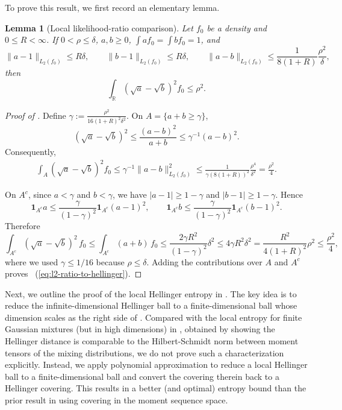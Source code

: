 \documentclass[letterpaper,11pt]{article}
\newcommand{\eqref}[1]{~(\ref{#1})}
\newtheorem{lemma}[theorem]{Lemma}
\theoremstyle{definition}
\begin{document}
To prove this result, we first record an elementary lemma.

\begin{lemma}[Local likelihood-ratio comparison]
\label{lmm:l2ratiohellinger}
Let $f_0$ be a density and $0\le R<\infty$.  
If $0<\rho\le\delta$, $a,b\ge0$, $\int a f_0=\int b f_0=1$, and
\[
\|a-1\|_{L_2(f_0)}\le R\delta,
\qquad
\|b-1\|_{L_2(f_0)}\le R\delta,
\qquad
\|a-b\|_{L_2(f_0)}
\le
\frac{1}{8(1+R)}
\frac{\rho^2}{\delta},
\]
then
\begin{equation}
\label{eq:l2-ratio-to-hellinger}
\int_{\mathbb R}(\sqrt a-\sqrt b)^2f_0\le\rho^2.
\end{equation}
\end{lemma}
\begin{proof}[Proof of ]
Define
$\gamma:=\frac{\rho^2}{16(1+R)^2\delta^2}$.
  On
$A=\{a+b\ge\gamma\}$,
\[
(\sqrt a-\sqrt b)^2\le\frac{(a-b)^2}{a+b}
\le \gamma^{-1}(a-b)^2.
\]
Consequently,
\[
\begin{aligned}
\int_A(\sqrt a-\sqrt b)^2f_0
\le
\gamma^{-1}\|a-b\|_{L_2(f_0)}^2 
\le
\frac{1}{\gamma (8(1+R))^2}
\frac{\rho^4}{\delta^2}
=\frac{\rho^2}{4}.
\end{aligned}
\]

On $A^c$, since $a<\gamma$ and $b<\gamma$, we have
$|a-1|\ge 1-\gamma$ and $|b-1|\ge 1-\gamma$. 
Hence
\[
\mathbf 1_{A^c}a\le
\frac{\gamma}{(1-\gamma)^2}\mathbf 1_{A^c}(a-1)^2,
\qquad
\mathbf 1_{A^c}b\le
\frac{\gamma}{(1-\gamma)^2}\mathbf 1_{A^c}(b-1)^2.
\]
Therefore
\[
\int_{A^c}(\sqrt a-\sqrt b)^2\,f_0
\le \int_{A^c}(a+b)\,f_0
\le \frac{2\gamma R^2}{(1-\gamma)^2}\delta^2
\leq 4\gamma R^2\delta^2
=
\frac{R^2}{4(1+R)^2}\rho^2
\le
\frac{\rho^2}{4},
\]
where we used $\gamma\le 1/16$ because $\rho\le\delta$.
Adding the contributions over $A$ and $A^c$ proves
\eqref{eq:l2-ratio-to-hellinger}.
\end{proof}





 Next, we outline the proof of the local Hellinger entropy in . 
The key idea is to reduce the infinite-dimensional Hellinger ball to a finite-dimensional ball whose dimension scales as the right side of . 
Compared with the local entropy for finite Gaussian mixtures (but in high dimensions) in \cite[Lemma 4.1 and Theorem 4.2]{doss2020optimal}, obtained by showing the Hellinger distance is comparable to the Hilbert-Schmidt norm between moment tensors of the mixing distributions, 
we do not prove such a characterization explicitly. Instead, we apply polynomial approximation to reduce a local Hellinger ball to a finite-dimensional ball and convert the covering therein back to a Hellinger covering. This results in a better (and optimal) entropy bound than the prior result in \cite{NW21} using covering in the moment sequence space. 
\end{document}
